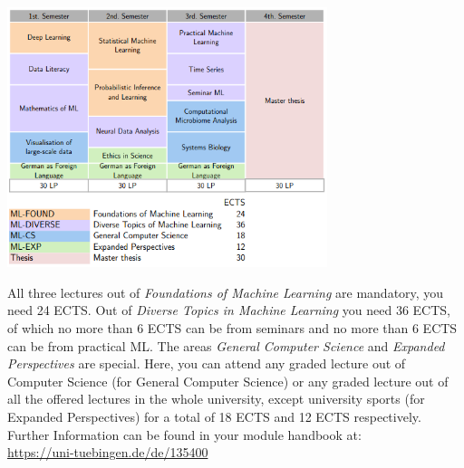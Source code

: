 \begin{center}
\includegraphics[width=0.7\textwidth]{media/ML_Biomed}\\
\end{center}

All three lectures out of \emph{Foundations of Machine Learning} are mandatory, you need 24 ECTS. Out of \emph{Diverse Topics in Machine Learning} you need 36 ECTS, of which no more than 6 ECTS can be from seminars and no more than 6 ECTS can be from practical ML. The areas \emph{General Computer Science} and \emph{Expanded Perspectives} are special. Here, you can attend any graded lecture out of Computer Science (for General Computer Science) or any graded lecture out
of all the offered lectures in the whole university, except university sports (for Expanded Perspectives) for a total of 18 ECTS and 12 ECTS respectively.
Further Information can be found in your module handbook at:\\
\url{https://uni-tuebingen.de/de/135400}
\pagebreak

